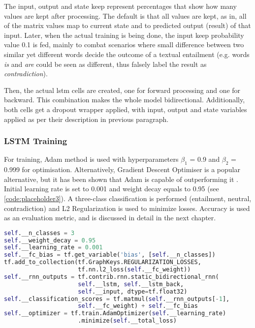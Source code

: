             The input, output and state keep represent percentages that show how many values are kept after processing. The default is that all values are kept, as in, all of the matrix values map to current state and to predicted output (result) of that input. Later, when the actual training is being done, the input keep probability value 0.1 is fed, mainly to combat scenarios where small difference between two similar yet different words decide the outcome of a textual entailment (e.g. words \textit{is} and \textit{are} could be seen as different, thus falsely label the result as \textit{contradiction}).
            
            Then, the actual \gls{lstm} cells are created, one for forward processing and one for backward. This combination makes the whole model bidirectional. Additionally, both cells get a dropout wrapper applied, with input, output and state variables applied as per their description in previous paragraph.
            
        \subsubsection{LSTM Training}
            For training, Adam method is used with hyperparameters $\beta_1$ = 0.9 and $\beta_2$ = 0.999 for optimisation. Alternatively, Gradient Descent Optimiser is a popular alternative, but it has been shown that Adam is capable of outperforming it \autocite{Kingma2015AdamAM}. Initial learning rate is set to 0.001 and weight decay equals to 0.95 (see \cref{code:placeholder3}). A three-class classification is performed (entailment, neutral, contradiction) and L2 Regularization is used to minimize losses. Accuracy is used as an evaluation metric, and is discussed in detail in the next chapter.
            
            \begin{lstlisting}[language=Python, caption=LSTM Training Parameters, label=code:placeholder3]
self.__n_classes = 3
self.__weight_decay = 0.95
self.__learning_rate = 0.001
self.__fc_bias = tf.get_variable('bias', [self.__n_classes])
tf.add_to_collection(tf.GraphKeys.REGULARIZATION_LOSSES, 
                     tf.nn.l2_loss(self.__fc_weight))
self.__rnn_outputs = tf.contrib.rnn.static_bidirectional_rnn(
                     self.__lstm, self.__lstm_back,
                     self.__input, dtype=tf.float32)
self.__classification_scores = tf.matmul(self.__rnn_outputs[-1], 
                     self.__fc_weight) + self.__fc_bias
self.__optimizer = tf.train.AdamOptimizer(self.__learning_rate)
                     .minimize(self.__total_loss)
            \end{lstlisting}
        
